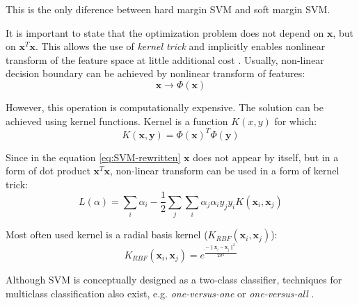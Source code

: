 This is the only diference between hard margin SVM and soft margin SVM.

It is important to state that the optimization problem does not depend on $\mathbf{x}$, but on $\mathbf{x}^T\mathbf{x}$. This allows the use of \emph{kernel trick} and implicitly enables nonlinear transform of the feature space at little additional cost \citep{Hofmann2008}. Usually, non-linear decision boundary can be achieved by nonlinear transform of features:
\begin{equation} 
\mathbf{x} \rightarrow \Phi(\mathbf{x})
\end{equation}

However, this operation is computationally expensive. The solution can be achieved using kernel functions. Kernel is a function $K(x,y)$ for which:
\begin{equation} 
K(\mathbf{x},\mathbf{y}) = \Phi(\mathbf{x})^T  \Phi(\mathbf{y})
\end{equation}

Since in the equation \ref{eq:SVM-rewritten} $\mathbf{x}$ does not appear by itself, but in a form of dot product $\mathbf{x}^T\mathbf{x}$, non-linear transform can be used in a form of kernel trick:
\begin{equation} 
L(\alpha) = \sum_i \alpha_i - \frac{1}{2} \sum_j \sum_i \alpha_j \alpha_i y_j y_i K(\mathbf{x}_i, \mathbf{x}_j)
\end{equation}

Most often used kernel is a radial basis kernel ($K_{RBF}(\mathbf{x}_i,\mathbf{x}_j)$):
\begin{equation} 
K_{RBF}(\mathbf{x}_i,\mathbf{x}_j) = e^\frac{-\parallel \mathbf{x}_i - \mathbf{x}_j\parallel^2}{2\sigma^2}
\end{equation}

Although SVM is conceptually designed as a two-class classifier, techniques for multiclass classification also exist, e.g. \emph{one-versus-one} or \emph{one-versus-all} \citep{Hsu2002}.

